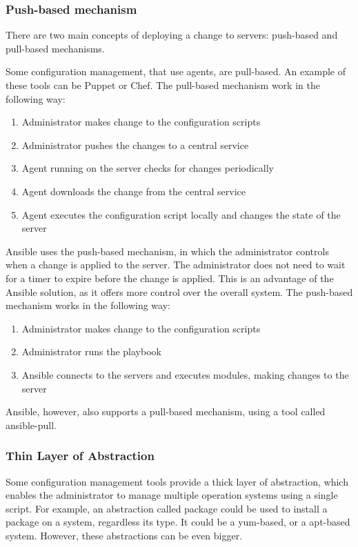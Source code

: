 \subsubsection*{Push-based mechanism}
There are two main concepts of deploying a change to servers: push-based and pull-based mechanisms.

Some configuration management, that use agents, are pull-based. An example of these tools can be Puppet or Chef. The pull-based mechanism work in the following way:
\begin{enumerate}
  \item{Administrator makes change to the configuration scripts}
  \item{Administrator pushes the changes to a central service}
  \item{Agent running on the server checks for changes periodically}
  \item{Agent downloads the change from the central service}
  \item{Agent executes the configuration script locally and changes the state of the server}
\end{enumerate}
Ansible uses the push-based mechanism, in which the administrator controls when a change is applied to the server. \cite{UpAndRunning} The administrator does not need to wait for a timer to expire before the change is applied. This is an advantage of the Ansible solution, as it offers more control over the overall system. The push-based mechanism works in the following way:
\begin{enumerate}
  \item{Administrator makes change to the configuration scripts}
  \item{Administrator runs the playbook}
  \item{Ansible connects to the servers and executes modules, making changes to the server}
\end{enumerate}
Ansible, however, also supports a pull-based mechanism, using a tool called ansible-pull.

\subsubsection*{Thin Layer of Abstraction}
Some configuration management tools provide a thick layer of abstraction, which enables the administrator to manage multiple operation systems using a single script. For example, an abstraction called package could be used to install a package on a system, regardless its type. It could be a yum-based, or a apt-based system. However, these abstractions can be even bigger.


